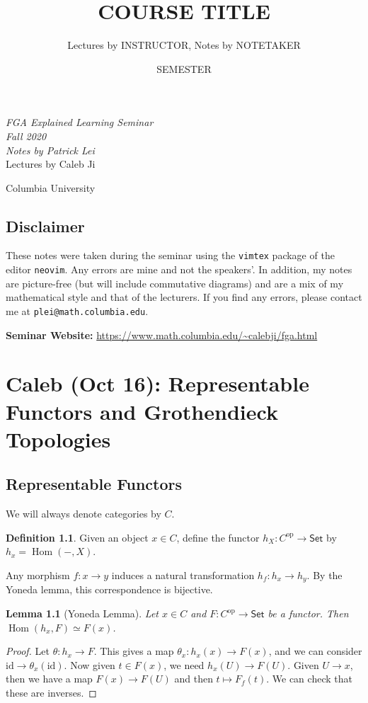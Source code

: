 \documentclass[leqno, openany]{memoir}
\title{COURSE TITLE}
\author{Lectures by INSTRUCTOR, Notes by NOTETAKER}
\date{SEMESTER}
\newtheorem{lem}[thm]{Lemma}
\theoremstyle{definition}
\newtheorem{defn}[thm]{Definition}
\theoremstyle{remark}
\theoremstyle{plain}
\theoremstyle{definition}
\theoremstyle{remark}
\newcommand{\mr}[1]{\mathrm{#1}}
\newcommand{\ms}[1]{\mathsf{#1}}
\DeclareMathOperator{\Hom}{Hom}
\newcommand*{\titleSW}
    {\begingroup%
    \raggedleft
    \vspace*{\baselineskip}
    {\Huge\itshape FGA Explained Learning Seminar \\ Fall 2020}\\[\baselineskip]
    {\large\itshape Notes by Patrick Lei}\\[0.2\textheight]
    {\Large Lectures by Caleb Ji}\par
    \vfill
    {\Large \sffamily Columbia University}
    \vspace*{\baselineskip}
\endgroup}
\begin{document}
    
\begin{titlingpage}
\titleSW
\end{titlingpage}

\thispagestyle{empty}
\section*{Disclaimer}%
\label{sec:disclaimer}

These notes were taken during the seminar using the \texttt{vimtex} package of the editor \texttt{neovim}. 
Any errors are mine and not the speakers'. 
In addition, my notes are picture-free (but will include commutative diagrams) and are a mix of my mathematical style and that of the lecturers.
If you find any errors, please contact me at \texttt{plei@math.columbia.edu}.

\vspace*{1cm}

\noindent\textbf{Seminar Website:}  \url{https://www.math.columbia.edu/~calebji/fga.html}
\newpage


\tableofcontents

\chapter{Caleb (Oct 16): Representable Functors and Grothendieck Topologies}%
\label{cha:caleb_oct_16_representable_functors_and_grothendieck_topologies}

\section{Representable Functors}%
\label{sec:representable_functors}

We will always denote categories by $C$.
\begin{defn}
    Given an object $x \in C$, define the functor $h_X \colon C^{\mr{op}} \to \ms{Set}$ by $h_x = \Hom(-,X)$.
\end{defn}

Any morphism $f \colon x \to y$ induces a natural transformation $h_f \colon h_x \to h_y$. By the Yoneda lemma, this correspondence is bijective.

\begin{lem}[Yoneda Lemma]
    Let $x \in C$ and $F \colon C^{\mr{op}} \to \ms{Set}$ be a functor. Then $\Hom(h_x,F) \simeq F(x)$.
\end{lem}

\begin{proof}
    Let $\theta \colon h_x \to F$. This gives a map $\theta_x \colon h_x(x) \to F(x)$, and we can consider $\mr{id} \to \theta_x(\mr{id})$. Now given $t \in F(x)$, we need $h_x(U) \to F(U)$. Given $U \to x$, then we have a map $F(x) \to F(U)$ and then $t \mapsto F_f(t)$. We can check that these are inverses.
\end{proof}
\end{document}
